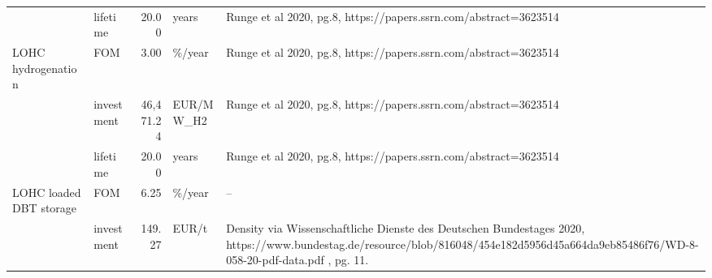 \begin{longtable}{p{5cm}p{3cm}rp{3cm}p{11cm}}
                      & lifetime &          20.00 &                             years &                                                                                                                                                                                                                                                                     Runge et al 2020, pg.8, https://papers.ssrn.com/abstract=3623514 \\
LOHC hydrogenation & FOM &           3.00 &                            \%/year &                                                                                                                                                                                                                                                                     Runge et al 2020, pg.8, https://papers.ssrn.com/abstract=3623514 \\
                      & investment &      46,471.24 &                         EUR/MW\_H2 &                                                                                                                                                                                                                                                                     Runge et al 2020, pg.8, https://papers.ssrn.com/abstract=3623514 \\
                      & lifetime &          20.00 &                             years &                                                                                                                                                                                                                                                                     Runge et al 2020, pg.8, https://papers.ssrn.com/abstract=3623514 \\
LOHC loaded DBT storage & FOM &           6.25 &                            \%/year &                                                                                                                                                                                                                                                                                                                                   -- \\
                      & investment &         149.27 &                             EUR/t &                                                                                                                                              Density via Wissenschaftliche Dienste des Deutschen Bundestages 2020, https://www.bundestag.de/resource/blob/816048/454e182d5956d45a664da9eb85486f76/WD-8-058-20-pdf-data.pdf , pg. 11. \\

\end{longtable}
